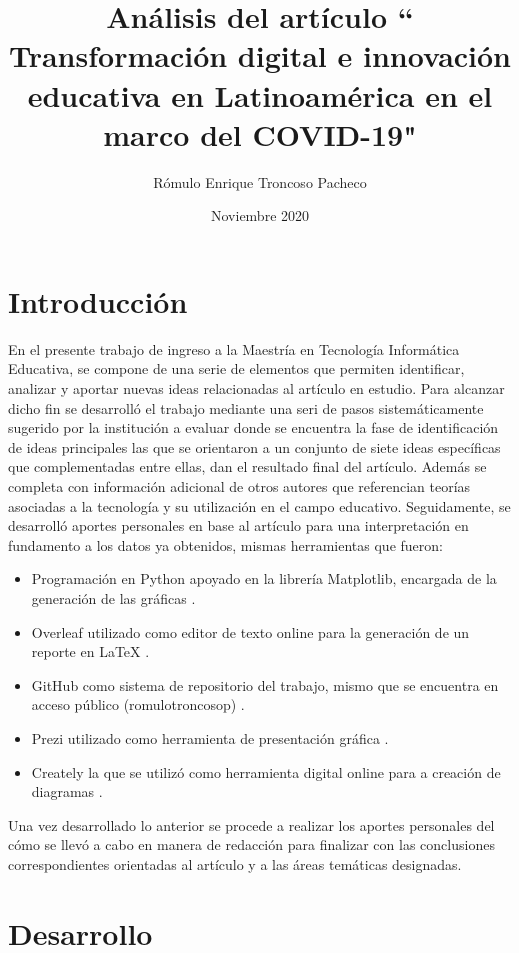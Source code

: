 \documentclass{article}
\title{Análisis del artículo “  Transformación  digital  e  innovación  educativa  en  Latinoamérica  en  el  marco  del COVID-19"}
\author{Rómulo Enrique Troncoso Pacheco}
\date{Noviembre 2020}
\begin{document}
\maketitle

\section{Introducción}

En el presente trabajo de ingreso a la Maestría en Tecnología Informática Educativa, se compone de una serie de elementos que permiten identificar, analizar y aportar nuevas ideas relacionadas al artículo \citep{Ramirez} en estudio.
Para alcanzar dicho fin se desarrolló el trabajo mediante una seri de pasos sistemáticamente sugerido por la institución a evaluar donde se encuentra la fase de identificación de ideas principales las que se orientaron a un conjunto de siete ideas específicas que complementadas entre ellas, dan el resultado final del artículo. Además se completa con información adicional de otros autores que referencian teorías asociadas a la tecnología y su utilización en el campo educativo.
Seguidamente, se desarrolló aportes personales en base al artículo para una interpretación en fundamento a los datos ya obtenidos, mismas herramientas que fueron:
\begin{itemize}
    \item Programación en Python apoyado en la librería Matplotlib, encargada de la generación de las gráficas \citep{python}.
    \item Overleaf  utilizado como editor de texto online \citep{Overleaf} para la generación de un reporte en LaTeX \citep{latex}.
    \item GitHub como sistema de repositorio del trabajo, mismo que se encuentra en acceso público (romulotroncosop) \citep{Github}.
    \item Prezi utilizado como herramienta de presentación gráfica \citep{prezi}.
    \item Creately la que se utilizó como herramienta digital online para a creación de diagramas \citep{Creately}.
\end{itemize}
Una vez desarrollado lo anterior se procede a realizar los aportes personales del cómo se llevó a cabo en manera de redacción para finalizar con las conclusiones correspondientes orientadas al artículo y a las áreas temáticas designadas.



\section{Desarrollo}
\end{document}
